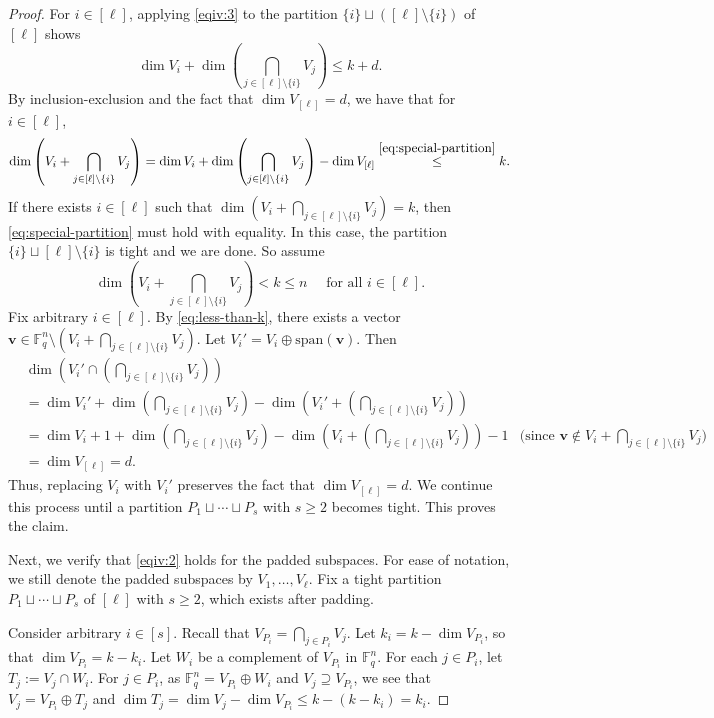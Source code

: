 \documentclass[10pt,a4paper]{amsart}
\newcommand{\F}{\mathbb{F}}
\newcommand{\bv}{\bm{v}}
\begin{document}
\begin{proof}
For $i\in [\ell]$, applying \cref{eqiv:3} to the partition $\{i\}\sqcup ([\ell]\setminus \{i\})$ of $[\ell]$ shows
\begin{equation}\label{eq:special-partition}
\dim V_i+\dim\left(\bigcap_{j\in[\ell]\setminus\{i\}}V_j\right)\leq k+d.
\end{equation}
By inclusion-exclusion and the fact that $\dim V_{[\ell]}=d$, we have that for $i\in [\ell]$,
\[\dim\left( V_i+\bigcap_{j\in[\ell]\setminus\{i\}}V_j\right)=\dim V_i+\dim\left(\bigcap_{j\in[\ell]\setminus\{i\}}V_j\right)-\dim V_{[\ell]}\stackrel{\eqref{eq:special-partition}}{\leq} k.
\]
If there exists $i\in[\ell]$ such that $\dim\left( V_i+\bigcap_{j\in[\ell]\setminus\{i\}}V_j\right)=k$, then
\eqref{eq:special-partition} must hold with equality. In this case, the partition $\{i\}\sqcup[\ell]\setminus\{i\}$ is tight and we are done.
So assume
\begin{equation}\label{eq:less-than-k}
\dim\left( V_i+\bigcap_{j\in[\ell]\setminus\{i\}}V_j\right)<k\leq n \quad \text{ for all } i\in[\ell].
\end{equation}
Fix arbitrary $i\in[\ell]$. By \eqref{eq:less-than-k}, there exists a vector $\bv\in\F_q^n\setminus (V_{i}+\bigcap_{j\in[\ell]\setminus\{{i}\}}V_j)$. Let $V_i'=V_i \oplus \mathrm{span}(\bv)$.
Then
\begin{align*} &\dim\left(V_i'\cap\left(\bigcap_{j\in[\ell]\setminus\{i\}}V_j\right)\right)\\
&=\dim V_i'+\dim\left(\bigcap_{j\in[\ell]\setminus\{i\}}V_j\right)-\dim\left(V_i'+\left(\bigcap_{j\in[\ell]\setminus\{i\}}V_j\right)\right)\\
&=\dim V_i+1+\dim\left(\bigcap_{j\in[\ell]\setminus\{i\}}V_j\right)-\dim\left(V_i+\left(\bigcap_{j\in[\ell]\setminus\{i\}}V_j\right)\right)-1 & \text{(since $\bv\notin  V_i+\bigcap_{j\in[\ell]\setminus\{i\}}V_j$)}\\
&=\dim V_{[\ell]}=d.
\end{align*}
Thus, replacing $V_i$ with $V_i'$ preserves the fact that $\dim V_{[\ell]} = d$.
We continue this process until a partition $P_1\sqcup\cdots\sqcup P_s$ with $s\geq 2$ becomes tight. This proves the claim. 

Next, we verify that \cref{eqiv:2} holds for the padded subspaces. For ease of notation, we still denote the padded subspaces by $V_1,\dots,V_\ell$. 
Fix a tight partition  $P_1\sqcup \cdots\sqcup P_s$ of $[\ell]$ with $s\geq 2$, which exists after padding.

Consider arbitrary $i\in [s]$. 
Recall that $V_{P_i}=\bigcap_{j\in P_i}V_j$.
Let $k_i=k-\dim V_{P_i}$, so that $\dim V_{P_i}=k-k_i$.
Let $W_i$ be a complement of $V_{P_i}$ in $\F_q^n$. 
For each $j\in P_i$, 
let $T_j:=V_j\cap W_i$.
For $j\in P_i$,
as $\F_q^n=V_{P_i}\oplus W_i$ and $V_j\supseteq V_{P_i}$, we see that $V_j=V_{P_i}\oplus T_j$ and $\dim T_j = \dim V_j - \dim V_{P_i}\leq k-(k-k_i)=k_i$.



\end{proof}
\end{document}
